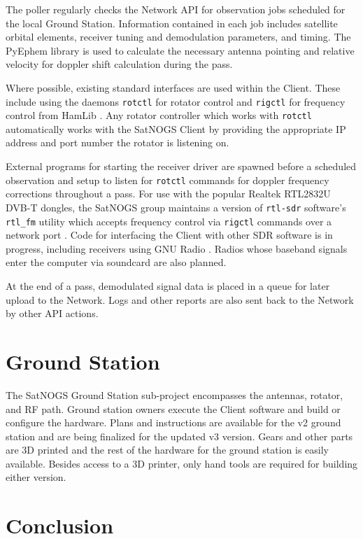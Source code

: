 \documentclass[conference,12pt]{IEEEtran}
\begin{document}
The poller regularly checks the Network API for observation jobs scheduled for the local Ground Station.
Information contained in each job includes satellite orbital elements, receiver tuning and demodulation parameters, and timing.
The PyEphem \cite{PyEphem} library is used to calculate the necessary antenna pointing and relative velocity for doppler shift calculation during the pass.

Where possible, existing standard interfaces are used within the Client.
These include using the daemons \verb|rotctl| for rotator control and \verb|rigctl| for frequency control from HamLib \cite{Hamlib}.
Any rotator controller which works with \verb|rotctl| automatically works with the SatNOGS Client by providing the appropriate IP address and port number the rotator is listening on.

External programs for starting the receiver driver are spawned before a scheduled observation and setup to listen for \verb|rotctl| commands for doppler frequency corrections throughout a pass.
For use with the popular Realtek RTL2832U DVB-T dongles, the SatNOGS group maintains a version of \verb|rtl-sdr| \cite{rtl-sdr} software's \verb|rtl_fm| utility which accepts frequency control via \verb|rigctl| commands over a network port \cite{SatNOGS-rtlsdr}.
Code for interfacing the Client with other SDR software is in progress, including receivers using GNU Radio \cite{GNURadio}.
Radios whose baseband signals enter the computer via soundcard are also planned.

At the end of a pass, demodulated signal data is placed in a queue for later upload to the Network.
Logs and other reports are also sent back to the Network by other API actions.


\section{Ground Station}
The SatNOGS Ground Station sub-project encompasses the antennas, rotator, and RF path.
Ground station owners execute the Client software and build or configure the hardware.
Plans and instructions are available for the v2 ground station and are being finalized for the updated v3 version.
Gears and other parts are 3D printed and the rest of the hardware for the ground station is easily available.
Besides access to a 3D printer, only hand tools are required for building either version.





\section{Conclusion}


\end{document}
